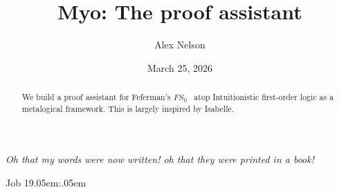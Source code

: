 \documentclass{amsart}
\title{Myo: The proof assistant}%
\author{Alex Nelson}
\date{March 25, 2026}
\def\hair{\kern.05em\relax}
\theoremstyle{empty}
\theoremstyle{definition}
\numberwithin{equation}{node}
\theoremstyle{plain}
\begin{document}
\begin{abstract}
We build a proof assistant for Feferman's
$FS_{0}$~\cite{feferman1989finitary} atop Intuitionistic first-order logic as a
metalogical framework. This is largely inspired by Isabelle.
\end{abstract}

\maketitle

\tableofcontents











%




\appendix




\nocite{robinson2001handbook}



\epigraph{\sffamily\slshape Oh that my words were now written!
oh that they were printed in a book!}{\sffamily Job 19\hair:\hair23}
\end{document}
